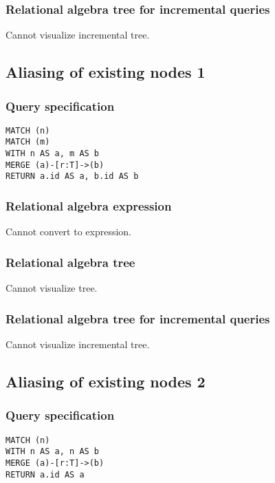 \subsubsection*{Relational algebra tree for incremental queries}

Cannot visualize incremental tree.

\subsection{Aliasing of existing nodes 1}

\subsubsection*{Query specification}

\begin{lstlisting}
MATCH (n)
MATCH (m)
WITH n AS a, m AS b
MERGE (a)-[r:T]->(b)
RETURN a.id AS a, b.id AS b
\end{lstlisting}

\subsubsection*{Relational algebra expression}

Cannot convert to expression.

\subsubsection*{Relational algebra tree}

Cannot visualize tree.

\subsubsection*{Relational algebra tree for incremental queries}

Cannot visualize incremental tree.

\subsection{Aliasing of existing nodes 2}

\subsubsection*{Query specification}

\begin{lstlisting}
MATCH (n)
WITH n AS a, n AS b
MERGE (a)-[r:T]->(b)
RETURN a.id AS a
\end{lstlisting}

